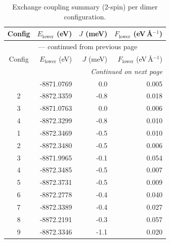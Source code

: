 
\begin{longtable}{@{}crrr@{}}
\caption{Exchange coupling summary (2-spin) per dimer configuration.}
\label{tab:exchange_couplings_2spin}\\
\toprule
Config & $E_{\mathrm{lower}}$ (eV) & $J$ (meV) & $F_{\mathrm{lower}}$ (eV\,\AA$^{-1}$)\\
\midrule
\endfirsthead
\multicolumn{4}{c}{{\tablename}~\thetable{} --- continued from previous page}\\
\toprule
Config & $E_{\mathrm{lower}}$ (eV) & $J$ (meV) & $F_{\mathrm{lower}}$ (eV\,\AA$^{-1}$)\\
\midrule
\endhead
\midrule
\multicolumn{4}{r}{\emph{Continued on next page}}\\
\endfoot
\bottomrule
\endlastfoot
1 & -8871.0769 & \textcolor{red!20}{0.0} & 0.005 \\
2 & -8872.3359 & \textcolor{blue!93}{-0.8} & 0.018 \\
3 & -8871.0763 & \textcolor{red!20}{0.0} & 0.006 \\
4 & -8872.3299 & \textcolor{blue!100}{-0.8} & 0.010 \\
1 & -8872.3469 & \textcolor{blue!55}{-0.5} & 0.010 \\
2 & -8872.3480 & \textcolor{blue!53}{-0.5} & 0.006 \\
3 & -8871.9965 & \textcolor{blue!24}{-0.1} & 0.054 \\
4 & -8872.3485 & \textcolor{blue!59}{-0.5} & 0.007 \\
5 & -8872.3731 & \textcolor{blue!56}{-0.5} & 0.009 \\
6 & -8872.2778 & \textcolor{blue!49}{-0.4} & 0.040 \\
7 & -8872.3389 & \textcolor{blue!49}{-0.4} & 0.027 \\
8 & -8872.2191 & \textcolor{blue!40}{-0.3} & 0.057 \\
9 & -8872.3346 & \textcolor{blue!100}{-1.1} & 0.020 \\
\end{longtable}